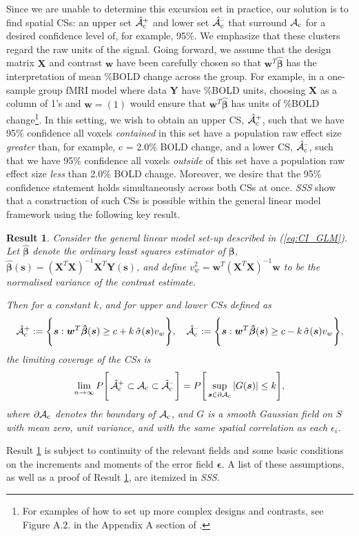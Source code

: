 Since we are unable to determine this excursion set in practice, our solution is to find spatial CSs: an upper set $\operatorname{\hat{\mathcal{A}}_{c}^+}$ and lower set $\operatorname{\hat{\mathcal{A}}_{c}^{\textrm{--}}}$ that surround $\operatorname{\mathcal{A}_{c}}$ for a desired confidence level of, for example, 95\%. We emphasize that these clusters regard the raw units of the signal. Going forward, we assume that the design matrix $\bm{X}$ and contrast $\bm{w}$ have been carefully chosen so that $\bm{w}^{T}\hat{\bm{\beta}}$ has the interpretation of mean \%BOLD change across the group. For example, in a one-sample group fMRI model where data $\bm{Y}$ have \%BOLD units, choosing $\bm{X}$ as a column of 1's and $\bm{w}=(1)$ would ensure that $\bm{w}^{T}\hat{\bm{\beta}}$ has units of \%BOLD change\footnote{For examples of how to set up more complex designs and contrasts, see Figure A.2. in the Appendix A section of \citep{Poldrack2011-bw}.}. In this setting, we wish to obtain an upper CS, $\operatorname{\hat{\mathcal{A}}_{c}^+}$, such that we have 95\% confidence all voxels \textit{contained} in this set have a population raw effect size \textit{greater} than, for example, c = 2.0\% BOLD change, and a lower CS, $\operatorname{\hat{\mathcal{A}}_{c}^{\textrm{--}}}$, such that we have 95\% confidence all voxels \textit{outside} of this set have a population raw effect size \textit{less} than 2.0\% BOLD change. Moreover, we desire that the 95\% confidence statement holds simultaneously across both CSs at once.
\textit{SSS} show that a construction of such CSs is possible within the general linear model framework using the following key result. 

\newtheorem{theorem}{Result}
\begin{theorem}
\label{thm:SSS_result}
Consider the general linear model set-up described in (\ref{eq:CI_GLM}). Let $\hat{\bm{\beta}}$ denote the ordinary least squares estimator of $\bm{\beta}$, $\hat{\bm{\beta}}(\bm{s})=(\bm{X}^T\bm{X})^{-1}\bm{X}^T\bm{Y}(\bm{s})$, and define
$v^{2}_{w}=\bm{w}^T(\bm{X}^T\bm{X})^{-1}\bm{w}$ 
to be the normalised variance of the contrast estimate.

Then for a constant $k$, and for upper and lower CSs defined as
$$\operatorname{\hat{\mathcal{A}}_{c}^+} := \Bigg\{\bm{s} : \bm{w}^{T}\bm{\hat{\beta}}(\bm{s}) \geq c + k\, \hat{\sigma}(\bm{s}) v_{w} \Bigg\}, \quad \operatorname{\hat{\mathcal{A}}_{c}^{\textrm{--}}} := \Bigg\{\bm{s} : \bm{w}^{T}\bm{\hat{\beta}}(\bm{s}) \geq c - k \,\hat{\sigma}(\bm{s}) v_{w}  \Bigg\},$$ 
the limiting coverage of the CSs is
$$\lim_{n\rightarrow\infty} P  \Bigg[\operatorname{\hat{\mathcal{A}}_{c}^+} \subset \operatorname{\mathcal{A}_{c}} \subset \operatorname{\hat{\mathcal{A}}_{c}^{\textrm{--}}}\Bigg] = P \Bigg[\sup_{\bm{s}\in\operatorname{\partial\mathcal{A}_{c}}}|G(\bm{s})|\leq k\Bigg],$$
where $\operatorname{\partial\mathcal{A}_{c}}$ denotes the boundary of $\operatorname{\mathcal{A}_{c}}$, and $G$ is a smooth Gaussian field on $S$ with mean zero, unit variance, and with the same spatial correlation as each $\epsilon_i$. 
\end{theorem}
Result \ref{thm:SSS_result} is subject to continuity of the relevant fields and some basic conditions on the increments and moments of the error field $\bm{\epsilon}$. A list of these assumptions, as well as a proof of Result \ref{thm:SSS_result}, are itemized in \textit{SSS}. 


